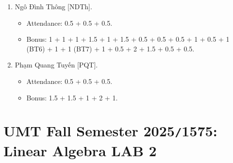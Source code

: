 \documentclass{article}
\begin{document}
\begin{enumerate}
\begin{itemize}
    \end{itemize}
    \item {\sc Ngô Đình Thông [NDTh].}
    \begin{itemize}
        \item Attendance: 0.5 + 0.5 + 0.5.
        \item Bonus: 1 + 1 + 1 + 1.5 + 1 + 1.5 + 0.5 + 0.5 + 0.5 + 1 + 0.5 + 1 (BT6) + 1 + 1 (BT7) + 1 + 0.5 + 2 + 1.5 + 0.5 + 0.5.
    \end{itemize}
    \item {\sc Phạm Quang Tuyến [PQT].}
    \begin{itemize}
        \item Attendance: 0.5 + 0.5 + 0.5.
        \item Bonus: 1.5 + 1.5 + 1 + 2 + 1.
    \end{itemize}
\end{enumerate}


\section{UMT Fall Semester 2025{\tt/}1575: Linear Algebra LAB 2}
\end{document}

